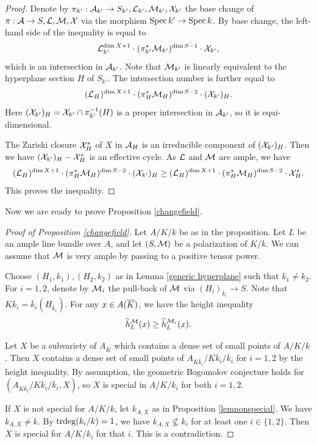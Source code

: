 \documentclass[12pt]{amsart}
\begin{document}
\begin{proof}
Denote by $\pi_{k'}:{\mathcal A}_{k'}\to S_{k'},{\mathcal L}_{k'},{\mathcal M}_{k'}, {\mathcal X}_{k'}$ the base change of $\pi:{\mathcal A}\to S,{\mathcal L},{\mathcal M}, {\mathcal X}$ via the morphism ${\rm Spec \,} k'\to {\rm Spec \,} k$.
By base change, the left-hand side of the inequality is equal to 
$$
{\mathcal L}_{k'}^{\dim X+1}\cdot (\pi_{k'}^*{\mathcal M}_{k'})^{\dim S-1} \cdot {\mathcal X}_{k'},$$
which is an intersection in ${\mathcal A}_{k'}$. 
Note that ${\mathcal M}_{k'}$ is linearly equivalent to the hyperplane section $H$ of $S_{k'}$.
The intersection number is further equal to 
$$({\mathcal L}_H)^{\dim X+1}\cdot (\pi_H^*{\mathcal M}_H)^{\dim S-2} \cdot ({\mathcal X}_{k'})_H.$$
Here $({\mathcal X}_{k'})_H= {\mathcal X}_{k'}\cap \pi_{k'}^{-1}(H)$ is a proper intersection in ${\mathcal A}_{k'}$, so it is equi-dimensional. 

The Zariski closure ${\mathcal X}_H^*$ of $X$ in ${\mathcal A}_H$ is an irreducible component of $({\mathcal X}_{k'})_H$.
Then we have $({\mathcal X}_{k'})_H- {\mathcal X}_H^*$ is an effective cycle. 
As ${\mathcal L}$ and ${\mathcal M}$ are ample, we have 
$$({\mathcal L}_H)^{\dim X+1}\cdot (\pi_H^*{\mathcal M}_H)^{\dim S-2} \cdot ({\mathcal X}_{k'})_H
\geq ({\mathcal L}_H)^{\dim X+1}\cdot (\pi_H^*{\mathcal M}_H)^{\dim S-2} \cdot {\mathcal X}_H^*.$$
This proves the inequality.
\end{proof}


Now we are ready to prove Proposition \ref{changefield}.

\begin{proof}[Proof of Proposition \ref{changefield}]
Let $A/K/k$ be as in the proposition.
Let $L$ be an ample line bundle over $A$, and let $(S,{\mathcal M})$ be a polarization of $K/k$.
We can assume that ${\mathcal M}$ is very ample by passing to a positive tensor power. 

Choose $(H_1,k_1), (H_2,k_2)$ as in Lemma \ref{generic hyperplane} such that $k_1\neq k_2$. 
For $i=1,2$, denote by ${\mathcal M}_i$ the pull-back of ${\mathcal M}$ via $(H_i)_{{\overline k_i}}\to S$. 
Note that $K{\overline k_i}={\overline k_i}(H_{{\overline k_i}}).$
For any $x\in A({\overline{K}})$, we have the height inequality
$$
\widehat h_L^{{\mathcal M}}(x)\geq \widehat h_L^{{\mathcal M}_i}(x).
$$

Let $X$ be a subvariety of $A_{\overline{K}}$ which contains a dense set of small points of $A/K/k$.
Then $X$ contains a dense set of small points of $A_{K{\overline k_i}}/K{\overline k_i}/{\overline k_i}$
for $i=1,2$ by the height inequality. 
By assumption, the geometric Bogomolov conjecture holds for $(A_{K{\overline k_i}}/K{\overline k_i}/{\overline k_i}, X)$, so $X$ is special in $A/K/k_i$ for both $i=1,2.$ 

If $X$ is not special for $A/K/k$, let $k_{A,X}$ as in Proposition \ref{lemnonspecial}. We have $k_{A,X}\neq k.$
By ${\mathrm{trdeg}}(k_i/k)=1$, we have $k_{A,X}\not\subseteq k_i$ for at least one $i\in \{1,2\}$.
Then $X$ is special for $A/K/k_i$ for that $i$.
This is a contradiction. 
\end{proof}
\end{document}
